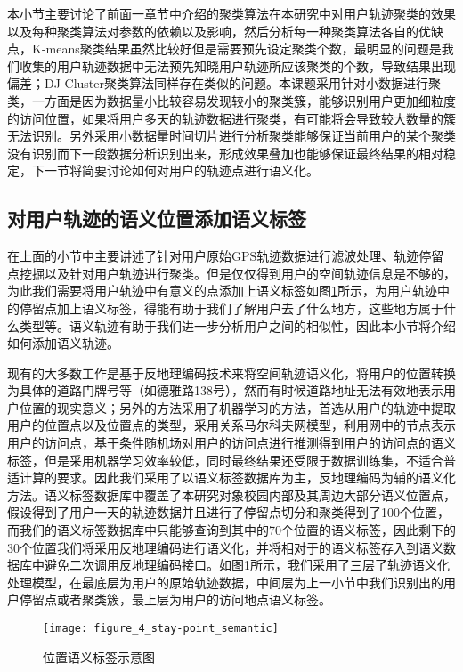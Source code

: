 \par 本小节主要讨论了前面一章节中介绍的聚类算法在本研究中对用户轨迹聚类的效果以及每种聚类算法对参数的依赖以及影响，然后分析每一种聚类算法各自的优缺点，K-means聚类结果虽然比较好但是需要预先设定聚类个数，最明显的问题是我们收集的用户轨迹数据中无法预先知晓用户轨迹所应该聚类的个数，导致结果出现偏差；DJ-Cluster聚类算法同样存在类似的问题。本课题采用针对小数据进行聚类，一方面是因为数据量小比较容易发现较小的聚类簇，能够识别用户更加细粒度的访问位置，如果将用户多天的轨迹数据进行聚类，有可能将会导致较大数量的簇无法识别。另外采用小数据量时间切片进行分析聚类能够保证当前用户的某个聚类没有识别而下一段数据分析识别出来，形成效果叠加也能够保证最终结果的相对稳定，下一节将简要讨论如何对用户的轨迹点进行语义化。
\subsection{对用户轨迹的语义位置添加语义标签}
\label{sec:section3-3}
\par 在上面的小节中主要讲述了针对用户原始GPS轨迹数据进行滤波处理、轨迹停留点挖掘以及针对用户轨迹进行聚类。但是仅仅得到用户的空间轨迹信息是不够的，为此我们需要将用户轨迹中有意义的点添加上语义标签如图\ref{fig:tra_senantic}所示，为用户轨迹中的停留点加上语义标签，得能有助于我们了解用户去了什么地方，这些地方属于什么类型等。语义轨迹有助于我们进一步分析用户之间的相似性，因此本小节将介绍如何添加语义轨迹。
\par 现有的大多数工作是基于反地理编码技术来将空间轨迹语义化，将用户的位置转换为具体的道路门牌号等（如德雅路138号），然而有时候道路地址无法有效地表示用户位置的现实意义；另外的方法采用了机器学习的方法，首选从用户的轨迹中提取用户的位置点以及位置点的类型，采用关系马尔科夫网模型，利用网中的节点表示用户的访问点，基于条件随机场对用户的访问点进行推测得到用户的访问点的语义标签，但是采用机器学习效率较低，同时最终结果还受限于数据训练集，不适合普适计算的要求。因此我们采用了以语义标签数据库为主，反地理编码为辅的语义化方法。语义标签数据库中覆盖了本研究对象校园内部及其周边大部分语义位置点，假设得到了用户一天的轨迹数据并且进行了停留点切分和聚类得到了100个位置，而我们的语义标签数据库中只能够查询到其中的70个位置的语义标签，因此剩下的30个位置我们将采用反地理编码进行语义化，并将相对于的语义标签存入到语义数据库中避免二次调用反地理编码接口。如图\ref{fig:tra_senantic}所示，我们采用了三层了轨迹语义化处理模型，在最底层为用户的原始轨迹数据，中间层为上一小节中我们识别出的用户停留点或者聚类簇，最上层为用户的访问地点语义标签。
\begin{figure}[htp]
\centering
\texttt{[image: figure\_4\_stay-point\_semantic]}
\caption{位置语义标签示意图}
\label{fig:tra_senantic}
\end{figure}

